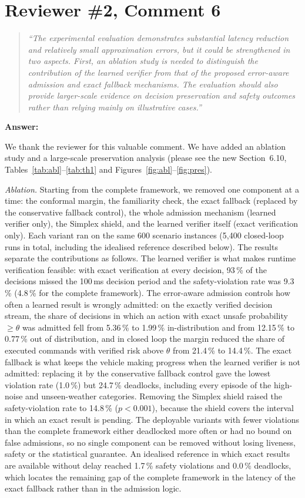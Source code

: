 \documentclass[11pt]{article}
\newenvironment{revcomment}{\begin{quote}\itshape}{\end{quote}}
\newcommand{\answerhead}[1]{\par\medskip\noindent\textbf{#1}\par}
\begin{document}
\section*{Reviewer \#2, Comment 6}
\begin{revcomment}
``The experimental evaluation demonstrates substantial latency reduction and relatively small approximation errors, but it could
be strengthened in two aspects. First, an ablation study is needed to distinguish the contribution of the learned verifier from
that of the proposed error-aware admission and exact fallback mechanisms. The evaluation should also provide larger-scale
evidence on decision preservation and safety outcomes rather than relying mainly on illustrative cases.''
\end{revcomment}
\answerhead{Answer:}
We thank the reviewer for this valuable comment. We have added an ablation study and a large-scale preservation analysis
(please see the new Section~6.10, Tables~\ref{tab:abl}--\ref{tab:th1} and Figures~\ref{fig:abl}--\ref{fig:pres}).

\emph{Ablation.} Starting from the complete framework, we removed one component at a time: the conformal margin, the
familiarity check, the exact fallback (replaced by the conservative fallback control), the whole admission mechanism (learned
verifier only), the Simplex shield, and the learned verifier itself (exact verification only). Each variant ran on the same
600 scenario instances (5,400 closed-loop runs in total, including the idealised reference described below). The results separate the
contributions as follows. The learned verifier is what makes runtime verification feasible: with exact verification at every
decision, 93\,\% of the decisions missed the 100\,ms decision period and the safety-violation rate was
9.3\,\% (4.8\,\% for the complete framework). The error-aware admission
controls how often a learned result is wrongly admitted: on the exactly verified decision stream, the share of decisions in
which an action with exact unsafe probability $\ge\theta$ was admitted fell from 5.36\,\% to
1.99\,\% in-distribution and from 12.15\,\% to
0.77\,\% out of distribution, and in closed loop the margin reduced the share of executed
commands with verified risk above $\theta$ from 21.4\,\% to 14.4\,\%.
The exact fallback is what keeps the vehicle making progress when the learned verifier is not admitted: replacing it by the
conservative fallback control gave the lowest violation rate (1.0\,\%) but
24.7\,\% deadlocks, including every episode of the high-noise and unseen-weather categories. Removing the
Simplex shield raised the safety-violation rate to 14.8\,\% ($p<0.001$),
because the shield covers the interval in which an exact result is pending. The deployable variants with fewer violations than the complete
framework either deadlocked more often or had no bound on false admissions, so no single component can be removed without losing
liveness, safety or the statistical guarantee. An idealised reference in which exact results are available without delay reached 1.7\,\% safety violations and 0.0\,\% deadlocks, which locates the remaining gap of the complete framework in the latency of the exact fallback rather than in the admission logic.
\end{document}

